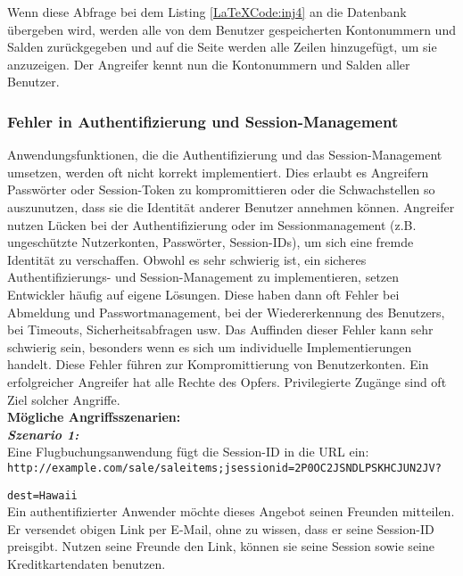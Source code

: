 Wenn diese Abfrage bei dem Listing \ref{LaTeXCode:inj4} an die Datenbank übergeben wird, werden alle von dem Benutzer gespeicherten Kontonummern und Salden zurückgegeben und auf die Seite werden alle Zeilen hinzugefügt, um sie anzuzeigen. Der Angreifer kennt nun die Kontonummern und Salden aller Benutzer.

\subsubsection{Fehler in Authentifizierung und Session-Management}

Anwendungsfunktionen, die die Authentifizierung und das Session-Management umsetzen, werden oft nicht korrekt implementiert. Dies erlaubt es Angreifern Passwörter oder Session-Token  zu kompromittieren oder die Schwachstellen so auszunutzen, dass sie die Identität anderer Benutzer annehmen können\cite[6]{owasp17top10}. Angreifer nutzen Lücken bei der Authentifizierung oder im Sessionmanagement (z.B. ungeschützte Nutzerkonten, Passwörter, Session-IDs), um sich eine fremde Identität zu verschaffen. Obwohl es sehr schwierig ist, ein sicheres Authentifizierungs- und Session-Management zu implementieren, setzen Entwickler häufig auf eigene Lösungen. Diese haben dann oft Fehler bei Abmeldung und Passwortmanagement, bei der Wiedererkennung des Benutzers, bei Timeouts, Sicherheitsabfragen usw. Das Auffinden dieser Fehler kann sehr schwierig sein, besonders wenn es sich um individuelle Implementierungen handelt. Diese Fehler führen zur Kompromittierung von Benutzerkonten. Ein erfolgreicher Angreifer hat alle Rechte des Opfers. Privilegierte Zugänge sind oft Ziel solcher Angriffe\cite[8]{owasp17top10}.\\

\textbf{Mögliche Angriffsszenarien:}\\

\textbf{\textit{Szenario 1:}}\\
Eine Flugbuchungsanwendung fügt die Session-ID in die URL ein\cite[8]{owasp17top10}:\\


\texttt{http://example.com/sale/saleitems;jsessionid=2P0OC2JSNDLPSKHCJUN2JV?}

\texttt{dest=Hawaii}\\

Ein authentifizierter Anwender möchte dieses Angebot seinen Freunden mitteilen. Er versendet obigen Link per E-Mail, ohne zu wissen, dass er seine Session-ID preisgibt. Nutzen seine Freunde den Link, können sie seine Session sowie seine Kreditkartendaten benutzen.\\


